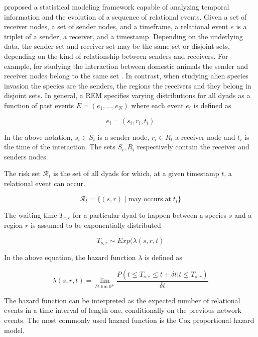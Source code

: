 \documentclass[mscthesis]{usiinfthesis}
\begin{document}
\citet{rem:butts} proposed a statistical modeling framework capable of analyzing temporal information and the evolution of a sequence of relational events. Given a set of receiver nodes, a set of sender nodes, and a timeframe, a relational event $e$ is a triplet of a sender, a receiver, and a timestamp. Depending on the underlying data, the sender set and receiver set may be the same set or disjoint sets, depending on the kind of relationship between senders and receivers. For example, for studying the interaction between domestic animals the sender and receiver nodes belong to the same set \cite{intro:cattle}. In contrast, when studying alien species invasion the species are the senders, the regions the receivers and they belong in disjoint sets. In general, a REM specifies varying distributions for all dyads as a function of past events $E=(e_1, ..., e_N)$ where each event $e_i$ is defined as

\[
e_i = (s_i, r_i, t_i)
\]

In the above notation, $s_i \in S_{t} $ is a sender node, $r_i \in R_{t}$ a receiver node and $t_i$ is the time of the interaction. The sets $S_i, R_i$ respectively contain the receiver and senders nodes.

%

The risk set $\mathcal{R}_t$ is the set of all dyads for which, at a given timestamp $t$, a relational event can occur.

\[
\mathcal{R}_{t} = \{(s,r) \; | \; \textrm{may occurs} \; \textrm{at} \; t_i\}
\]

The waiting time $T_{s,r}$ for a particular dyad to happen between a species $s$ and a region $r$ is assumed to be exponentially distributed 

\[
T_{s,r} \sim Exp(\lambda(s, r, t)
\]


In the above equation, the hazard function $\lambda$ is defined as

\[
\lambda(s, r, t) = \lim_{\delta t \lim 0^+} \frac{P(t \leq T_{s,r} \leq t + \delta t | t \leq T_{s,r})}{\delta t}
\]

The hazard function can be interpreted as the expected number of relational events in a time interval of length one, conditionally on the previous network events. The most commonly used hazard function is the Cox proportional hazard model. 
\end{document}
